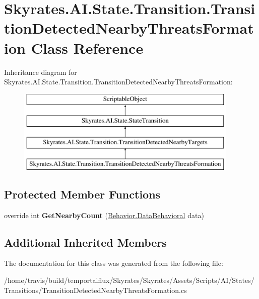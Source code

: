 \hypertarget{class_skyrates_1_1_a_i_1_1_state_1_1_transition_1_1_transition_detected_nearby_threats_formation}{\section{Skyrates.\-A\-I.\-State.\-Transition.\-Transition\-Detected\-Nearby\-Threats\-Formation Class Reference}
\label{class_skyrates_1_1_a_i_1_1_state_1_1_transition_1_1_transition_detected_nearby_threats_formation}
}
Inheritance diagram for Skyrates.\-A\-I.\-State.\-Transition.\-Transition\-Detected\-Nearby\-Threats\-Formation\-:\begin{figure}[H]
\begin{center}
\leavevmode
\includegraphics[height=4.000000cm]{class_skyrates_1_1_a_i_1_1_state_1_1_transition_1_1_transition_detected_nearby_threats_formation}
\end{center}
\end{figure}
\subsection*{Protected Member Functions}
\begin{DoxyCompactItemize}
\item 
\hypertarget{class_skyrates_1_1_a_i_1_1_state_1_1_transition_1_1_transition_detected_nearby_threats_formation_a8bed6b0608fdbf06db3b888d530eb898}{override int {\bfseries Get\-Nearby\-Count} (\hyperlink{class_skyrates_1_1_a_i_1_1_behavior_1_1_data_behavioral}{Behavior.\-Data\-Behavioral} data)}\label{class_skyrates_1_1_a_i_1_1_state_1_1_transition_1_1_transition_detected_nearby_threats_formation_a8bed6b0608fdbf06db3b888d530eb898}

\end{DoxyCompactItemize}
\subsection*{Additional Inherited Members}


The documentation for this class was generated from the following file\-:\begin{DoxyCompactItemize}
\item 
/home/travis/build/temportalflux/\-Skyrates/\-Skyrates/\-Assets/\-Scripts/\-A\-I/\-States/\-Transitions/Transition\-Detected\-Nearby\-Threats\-Formation.\-cs\end{DoxyCompactItemize}
